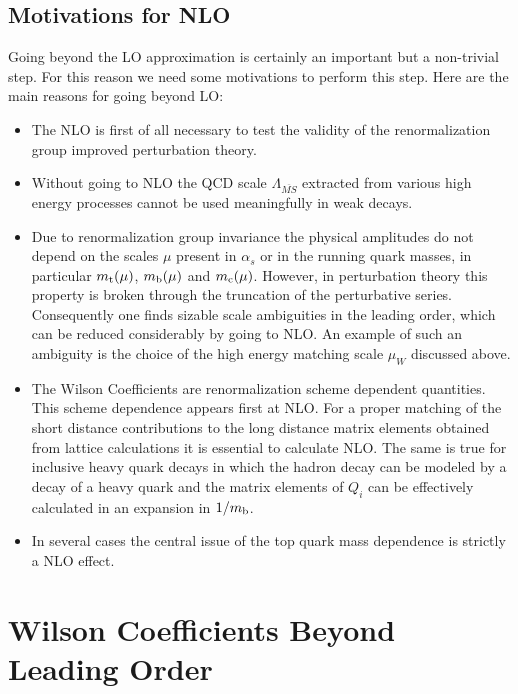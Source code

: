 \documentclass[12pt,rotate]{article}
\newcommand{\mt}{m_{\rm t}}
\newcommand{\mc}{m_{\rm c}}
\newcommand{\mb}{m_{\rm b}}
\begin{document}
\begin{itemize}
\begin{itemize}
\begin{itemize}
\subsection{Motivations for NLO}
Going beyond the LO approximation is certainly an important but a 
non-trivial step. For this reason we need some motivations to perform
this step. Here are the main reasons for going beyond LO:
\begin{itemize}
\item The NLO is first of all necessary to test the validity of
the renormalization group improved perturbation theory.
\item Without going to NLO the QCD scale $\Lambda_{\overline{MS}}$
extracted from various high energy processes cannot be used 
meaningfully in weak decays.
\item 
Due to renormalization group invariance the physical
amplitudes do not depend on the scales $\mu$ present in $\alpha_s$
or in the running quark masses, in particular $\mt(\mu)$, 
$\mb(\mu)$ and $\mc(\mu)$. However,
in perturbation theory this property is broken through the truncation
of the perturbative series. Consequently one finds sizable scale
ambiguities in the leading order, which can be reduced considerably
by going to NLO. An example of such an ambiguity is the choice of the
high energy matching scale $\mu_W$ discussed above.
\item
The Wilson Coefficients are renormalization scheme dependent quantities.
This scheme dependence appears first at NLO. For a proper matching of
the short distance contributions to the long distance matrix elements
obtained from lattice calculations it is essential to calculate NLO.
The same is true for inclusive heavy quark decays in which the hadron
decay can be modeled by a decay of a heavy quark and the matrix elements
of $Q_i$ can be effectively calculated in an expansion in $1/\mb$.
\item 
In several cases the central issue of the top quark mass dependence
is strictly a NLO effect.
\end{itemize}

\section{Wilson Coefficients Beyond Leading Order}
\setcounter{equation}{0}

\end{itemize}
\end{itemize}
\end{itemize}
\end{document}

